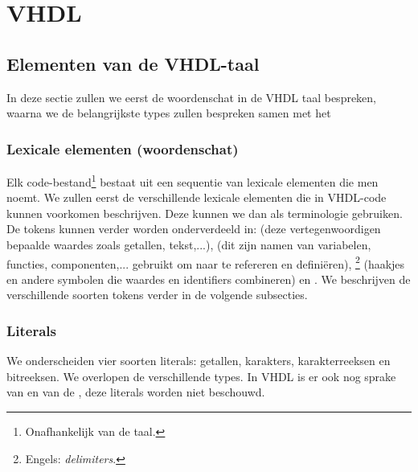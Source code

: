 \chapter{VHDL}
\minitoc[n]
\section{Elementen van de VHDL-taal}
In deze sectie zullen we eerst de woordenschat in de VHDL taal bespreken, waarna we de belangrijkste types zullen bespreken samen met het 
\subsection{Lexicale elementen (woordenschat)}
Elk code-bestand\footnote{Onafhankelijk van de taal.} bestaat uit een sequentie van lexicale elementen die men  noemt. We zullen eerst de verschillende lexicale elementen die in VHDL-code kunnen voorkomen beschrijven. Deze kunnen we dan als terminologie gebruiken. De tokens kunnen verder worden onderverdeeld in:  (deze vertegenwoordigen bepaalde waardes zoals getallen, tekst,...),  (dit zijn namen van variabelen, functies, componenten,... gebruikt om naar te refereren en defini\"eren), \footnote{Engels: \emph{delimiters}.} (haakjes en andere symbolen die waardes en identifiers combineren) en . We beschrijven de verschillende soorten tokens verder in de volgende subsecties.

\subsection{Literals}
We onderscheiden vier soorten literals: getallen, karakters, karakterreeksen en bitreeksen. We overlopen de verschillende types. In VHDL is er ook nog sprake van  en van de , deze literals worden niet beschouwd.

